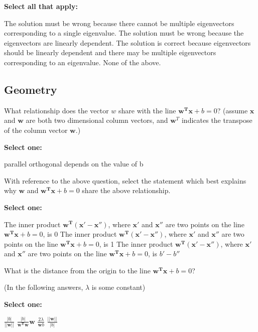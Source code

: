 \documentclass[11pt,addpoints,answers]{exam}
\numberwithin{equation}{section} %
\numberwithin{figure}{section} %
\numberwithin{table}{section} %
\begin{document}
\begin{questions}
    \textbf{Select all that apply:}
    
    \begin{checkboxes}{%
    \checkboxchar{$\Box$} \checkedchar{$\blacksquare$}
        \choice The solution must be wrong because there cannot be multiple eigenvectors corresponding to a single eigenvalue.
        \choice The solution must be wrong because the eigenvectors are linearly dependent.
        \choice The solution is correct because eigenvectors should be linearly dependent and there may be multiple eigenvectors corresponding to an eigenvalue.
        \choice None of the above.
    }
    \end{checkboxes}
    
    
    
    \clearpage
\end{questions}

\subsection{Geometry}
\begin{questions}
    \question[2] What relationship does the vector $w$ share with the line $\mathbf{w^Tx}+b = 0$?
    (assume $\mathbf{x}$ and $\mathbf{w}$ are both two dimensional column vectors, and $\mathbf{w}^T$ indicates the transpose of the column vector $\mathbf{w}$.)
    
    \textbf{Select one:}
    \begin{checkboxes}{}
        \choice parallel
        \choice orthogonal
        \choice depends on the value of b
    \end{checkboxes}

    
    \question[1] With reference to the above question, select the statement which best explains why $\mathbf{w}$ and $\mathbf{w^Tx} + b = 0$ share the above relationship.
    
    \textbf{Select one:}
    \begin{checkboxes}{}
        \choice The inner product $\mathbf{w^T(x' - x'')}$, where $\mathbf{x'}$ and $\mathbf{x''}$ are two points on the line $\mathbf{w^Tx}+b=0$, is 0
        \choice The inner product $\mathbf{w^T(x' - x'')}$, where $\mathbf{x'}$ and $\mathbf{x''}$ are two points on the line $\mathbf{w^Tx}+b=0$, is 1
        \choice The inner product $\mathbf{w^T(x' - x'')}$, where $\mathbf{x'}$ and $\mathbf{x''}$ are two points on the line $\mathbf{w^Tx}+b=0$, is $b' - b''$
    \end{checkboxes}

    
    \question[2] What is the distance from the origin to the line $\mathbf{w^Tx}+b=0$?
    
    (In the following answers, $\lambda$ is some constant)
    
    \textbf{Select one:}
    \begin{checkboxes}{}
        \choice $\frac{|b|}{||\mathbf{w}||}$
        \choice $\frac{|b|}{\mathbf{w^Tw}}\mathbf{w}$
        \choice $\frac{2\lambda}{\mathbf{w}b}$
        \choice $\frac{||\mathbf{w}||}{|b|}$
    \end{checkboxes}


  

    \clearpage
\end{questions}
\end{document}
